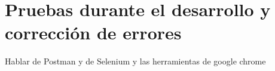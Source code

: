 \chapter{Pruebas durante el desarrollo y corrección de errores}

Hablar de Postman y de Selenium y las herramientas de google chrome